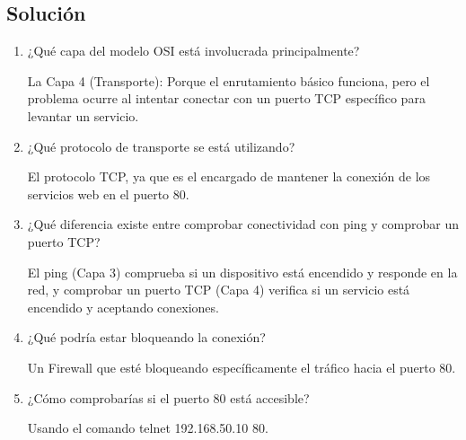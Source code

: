 \subsection*{Solución}
\begin{enumerate}[label=\arabic*., leftmargin=*]
    \item ¿Qué capa del modelo OSI está involucrada principalmente?
    
    La Capa 4 (Transporte): Porque el enrutamiento básico funciona, pero el problema 
    ocurre al intentar conectar con un puerto TCP específico para levantar un servicio.

    \item ¿Qué protocolo de transporte se está utilizando?
    
    El protocolo TCP, ya que es el encargado de mantener la conexión de los servicios web en el puerto 80.
    
    \item ¿Qué diferencia existe entre comprobar conectividad con ping y comprobar un puerto TCP?
    
    El ping (Capa 3) comprueba si un dispositivo está encendido y responde en la red, y comprobar un puerto TCP (Capa 4) 
    verifica si un servicio está encendido y aceptando conexiones.
    
    \item ¿Qué podría estar bloqueando la conexión?
    
    Un Firewall que esté bloqueando específicamente el tráfico hacia el puerto 80.
    
    \item ¿Cómo comprobarías si el puerto 80 está accesible?
    
    Usando el comando telnet 192.168.50.10 80.
\end{enumerate}

